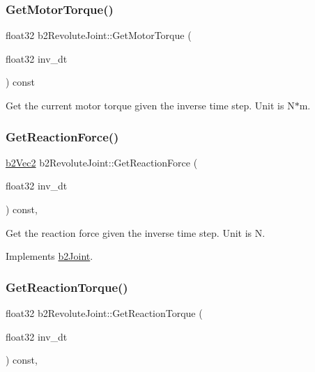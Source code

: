 \subsubsection{\texorpdfstring{Get\+Motor\+Torque()}{GetMotorTorque()}}
{\footnotesize\ttfamily float32 b2\+Revolute\+Joint\+::\+Get\+Motor\+Torque (\begin{DoxyParamCaption}\item[{float32}]{inv\+\_\+dt }\end{DoxyParamCaption}) const}

Get the current motor torque given the inverse time step. Unit is N$\ast$m. \mbox{\label{classb2_revolute_joint_abeb7bf941589aed0d7f330a578a62024}} 
\subsubsection{\texorpdfstring{Get\+Reaction\+Force()}{GetReactionForce()}}
{\footnotesize\ttfamily \hyperlink{structb2_vec2}{b2\+Vec2} b2\+Revolute\+Joint\+::\+Get\+Reaction\+Force (\begin{DoxyParamCaption}\item[{float32}]{inv\+\_\+dt }\end{DoxyParamCaption}) const\hspace{0.3cm}{\ttfamily [override]}, {\ttfamily [virtual]}}

Get the reaction force given the inverse time step. Unit is N. 

Implements \hyperlink{classb2_joint_a7e0eddefb9b69ad050b8ef6425838a74}{b2\+Joint}.

\mbox{\label{classb2_revolute_joint_aab61a3f330aa93ae28f657e36bc3db51}} 
\subsubsection{\texorpdfstring{Get\+Reaction\+Torque()}{GetReactionTorque()}}
{\footnotesize\ttfamily float32 b2\+Revolute\+Joint\+::\+Get\+Reaction\+Torque (\begin{DoxyParamCaption}\item[{float32}]{inv\+\_\+dt }\end{DoxyParamCaption}) const\hspace{0.3cm}{\ttfamily [override]}, {\ttfamily [virtual]}}

